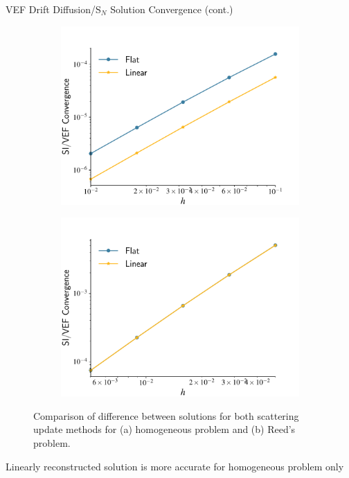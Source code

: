 \documentclass[10pt]{beamer}
\newcommand{\SN}{S$_N$\xspace}
\begin{document}
\begin{frame}{VEF Drift Diffusion/\SN Solution Convergence (cont.)}

	\begin{figure}[htb]
		\centering
		\begin{subfigure}{.5\textwidth}
			\centering
			\includegraphics[width=\textwidth]{figs/solconv_homo.pdf}
			\caption{}
			\label{fig:homo}
		\end{subfigure}
		\hspace{-2em}
		\begin{subfigure}{.5\textwidth}
			\centering
			\includegraphics[width=\textwidth]{figs/solconv_reed.pdf}
			\caption{}
			\label{fig:reed}
		\end{subfigure}
		\caption{Comparison of difference between solutions for both scattering update methods for (a) homogeneous problem and (b) Reed's problem. }
	\end{figure}

	\pause
	\begin{block}{}
		\centering Linearly reconstructed solution is more accurate for homogeneous problem only 
	\end{block}

\end{frame}
\end{document}
